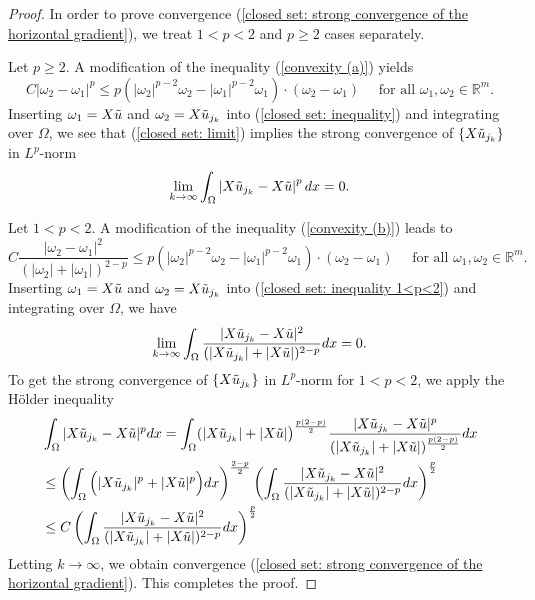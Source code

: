 \documentclass[a4paper,12pt,reqno]{amsart}
\renewcommand\eqref[1]{(\ref{#1})} %
\numberwithin{equation}{section}
\theoremstyle{plain}
\theoremstyle{definition}
\begin{document}
\begin{proof}
In order to prove convergence \eqref{closed set: strong convergence of the horizontal gradient}, we treat $1<p<2$ and $p\geq2$ cases separately.



Let $p\geq 2$. A modification  of the inequality \eqref{convexity (a)} yields
\begin{equation}\label{closed set: inequality}
C\left|\omega_{2}-\omega_{1}\right|^{p} \leq p\left(\left|\omega_{2}\right|^{p-2} \omega_{2}-\left|\omega_{1}\right|^{p-2} \omega_{1}\right) \cdot\left(\omega_{2}-\omega_{1}\right) \quad \text{ for all }\omega_{1}, \omega_{2} \in \mathbb{R}^{m}.
\end{equation}
Inserting $\omega_{1}=X \Tilde{u}$ and $\omega_{2}=X \Tilde{u}_{j_{k}}$ into \eqref{closed set: inequality} and integrating over $\Omega$, we see that \eqref{closed set: limit} implies the strong convergence of $\{X \Tilde{u}_{j_{k}}\}$ in $L^{p}$-norm 
$$
\lim _{k \rightarrow \infty} \int_{\Omega}\left|X \Tilde{u}_{j_{k}}-X \Tilde{u}\right|^{p} d x=0 .
$$



Let $1<p<2$.
A modification  of the inequality \eqref{convexity (b)} leads to
\begin{equation}\label{closed set: inequality 1<p<2}
C\frac{|\omega_{2}-\omega_{1}|^{2}}{(|\omega_{2}|+|\omega_{1}|)^{2-p}}   \leq p\left(\left|\omega_{2}\right|^{p-2} \omega_{2}-\left|\omega_{1}\right|^{p-2} \omega_{1}\right)\cdot\left(\omega_{2}-\omega_{1}\right) \quad \text{ for all }\omega_{1}, \omega_{2} \in \mathbb{R}^{m}.
\end{equation}
Inserting $\omega_{1}=X \Tilde{u}$ and $\omega_{2}=X \Tilde{u}_{j_{k}}$ into \eqref{closed set: inequality 1<p<2} and integrating over $\Omega$, we have
\begin{equation*}
\lim_{k\to\infty}\int_{\Omega}\frac{|X \Tilde{u}_{j_{k}}-X \Tilde{u}|^{2}}{(|X \Tilde{u}_{j_{k}}|+|X \Tilde{u}|)^{2-p}}dx=0.
\end{equation*}
To get the strong convergence of $\{X \Tilde{u}_{j_{k}}\}$ in $L^{p}$-norm for $1<p<2$, we apply the H\"older inequality 
\begin{equation}\label{1<p<2 convergence}
\begin{aligned}
&\int_{\Omega}|X \Tilde{u}_{j_{k}}-X \Tilde{u}|^{p}dx=\int_{\Omega}(|X \Tilde{u}_{j_{k}}|+|X \Tilde{u}|\big)^{\frac{p(2-p)}{2}}\frac{|X \Tilde{u}_{j_{k}}-X \Tilde{u}|^{p}}{(|X \Tilde{u}_{j_{k}}|+|X \Tilde{u}|)^{\frac{p(2-p)}{2}}}dx
\\
&\leq\left(\int_{\Omega}\Big(|X \Tilde{u}_{j_{k}}|^{p}+|X \Tilde{u}|^{p}\Big)dx \right)^{\frac{2-p}{2}}\left(\int_{\Omega}\frac{|X \Tilde{u}_{j_{k}}-X \Tilde{u}|^{2}}{(|X \Tilde{u}_{j_{k}}|+|X \Tilde{u}|)^{2-p}}dx \right)^{\frac{p}{2}}
\\
&\leq C\left(\int_{\Omega}\frac{|X \Tilde{u}_{j_{k}}-X \Tilde{u}|^{2}}{(|X \Tilde{u}_{j_{k}}|+|X \Tilde{u}|)^{2-p}}dx \right)^{\frac{p}{2}}
\end{aligned}
\end{equation}
Letting $k\to\infty$, we obtain convergence \eqref{closed set: strong convergence of the horizontal gradient}. This completes the proof.
\end{proof}
\end{document}
